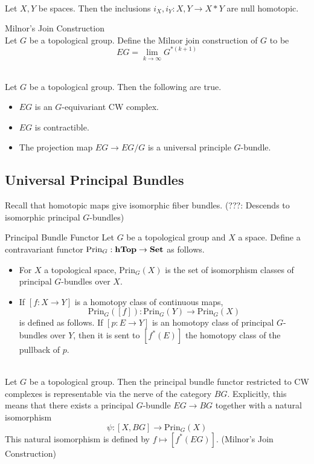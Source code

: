 \documentclass[a4paper]{article}
\begin{document}
\begin{lmm}{}{}\\
Let $X,Y$ be spaces. Then the inclusions $i_X,i_Y:X,Y\to X\ast Y$ are null homotopic. 
\end{lmm}

\begin{defn}{Milnor's Join Construction}{}\\
Let $G$ be a topological group. Define the Milnor join construction of $G$ to be $$EG=\lim_{k\to\infty}G^{\ast(k+1)}$$
\end{defn}

\begin{lmm}{}{}\\
Let $G$ be a topological group. Then the following are true. 
\begin{itemize}
\item $EG$ is an $G$-equivariant CW complex. 
\item $EG$ is contractible. 
\item The projection map $EG\to EG/G$ is a universal principle $G$-bundle. 
\end{itemize}
\end{lmm}

\subsection{Universal Principal Bundles}
Recall that homotopic maps give isomorphic fiber bundles. (???: Descends to isomorphic principal $G$-bundles)

\begin{defn}{Principal Bundle Functor}{} Let $G$ be a topological group and $X$ a space. Define a contravariant functor $\text{Prin}_G:\bold{hTop}\to\bold{Set}$ as follows. 
\begin{itemize}
\item For $X$ a topological space, $\text{Prin}_G(X)$ is the set of isomorphism classes of principal $G$-bundles over $X$. 
\item If $[f:X\to Y]$ is a homotopy class of continuous maps, $$\text{Prin}_G([f]):\text{Prin}_G(Y)\to\text{Prin}_G(X)$$ is defined as follows. If $[p:E\to Y]$ is an homotopy class of principal $G$-bundles over $Y$, then it is sent to $[f^\ast(E)]$ the homotopy class of the pullback of $p$. 
\end{itemize}
\end{defn}

\begin{prp}{}{}\\
Let $G$ be a topological group. Then the principal bundle functor restricted to CW complexes is representable via the nerve of the category $BG$. Explicitly, this means that there exists a principal $G$-bundle $EG\to BG$ together with a natural isomorphism $$\psi:[X,BG]\to\text{Prin}_G(X)$$ This natural isomorphism is defined by $f\mapsto[f^\ast(EG)]$. (Milnor's Join Construction)
\end{prp}
\end{document}
